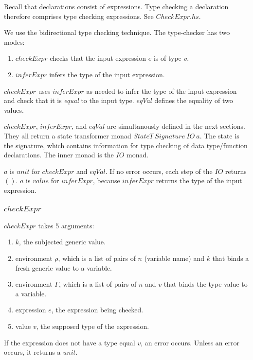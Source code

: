 \documentclass[acmsmall]{acmart}
\begin{document}
Recall that declarations consist of expressions. Type checking a declaration therefore comprises type checking expressions. See $CheckExpr.hs$. 

We use the bidirectional type checking technique. The type-checker has two modes:

\begin{enumerate}
  \item $checkExpr$ checks that the input expression $e$ is of type $v$.
  \item $inferExpr$ infers the type of the input expression.
\end{enumerate}

$checkExpr$ uses $inferExpr$ as needed to infer the type of the input expression and check that it is \emph{equal} to the input type. $eqVal$ defines the equality of two values.

$checkExpr$, $inferExpr$, and $eqVal$ are simultanously defined in the next sections. They all return a state transformer monad $StateT \: Signature \: IO \: a$. The state is the signature, which contains information for type checking of data type/function declarations. The inner monad is the $IO$ monad. 

$a$ is $unit$ for $checkExpr$ and $eqVal$. If no error occurs, each step of the $IO$ returns $()$. $a$ is $value$ for $inferExpr$, because $inferExpr$ returns the type of the input expression.

\subsubsection{$checkExpr$}
\label{sec:checkExpr}

$checkExpr$ takes 5 arguments:

\begin{enumerate}
  \item $k$, the subjected generic value.
  \item environment $\rho$, which is a list of pairs of $n$ (variable name) and $k$ that binds a fresh generic value to a variable.
  \item environment $\Gamma$, which is a list of pairs of $n$ and $v$ that binds the type value to a variable.
  \item expression $e$, the expression being checked.
  \item value $v$, the supposed type of the expression.
\end{enumerate}

If the expression does not have a type equal $v$, an error occurs. Unless an error occurs, it returns a $unit$.
\end{document}
